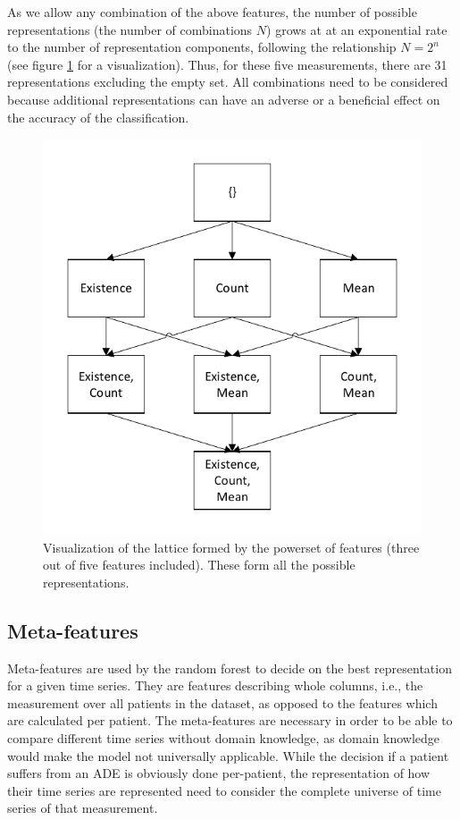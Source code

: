 \documentclass[conference]{IEEEtran}
\begin{document}
As we allow any combination of the above features, the number of possible representations (the number of combinations $N$) grows at at an exponential rate to the number of representation components, following the relationship $N = 2^n$ (see figure \ref{fig_powerset} for a visualization). Thus, for these five measurements, there are 31 representations excluding the empty set. All combinations need to be considered because additional representations can have an adverse or a beneficial effect on the accuracy of the classification.

\begin{figure}[!t]
\centering
\includegraphics[width=.45\textwidth]{Drawing7.pdf}
\caption{Visualization of the lattice formed by the powerset of features (three out of five features included). These form all the possible representations.}
\label{fig_powerset}
\end{figure}

\subsection{Meta-features}
Meta-features are used by the random forest to decide on the best representation for a given time series. They are features describing whole columns, i.e., the measurement over all patients in the dataset, as opposed to the features which are calculated per patient. The meta-features are necessary in order to be able to compare different time series without domain knowledge, as domain knowledge would make the model not universally applicable. While the decision if a patient suffers from an ADE is obviously done per-patient, the representation of how their time series are represented need to consider the complete universe of time series of that measurement.
\end{document}
